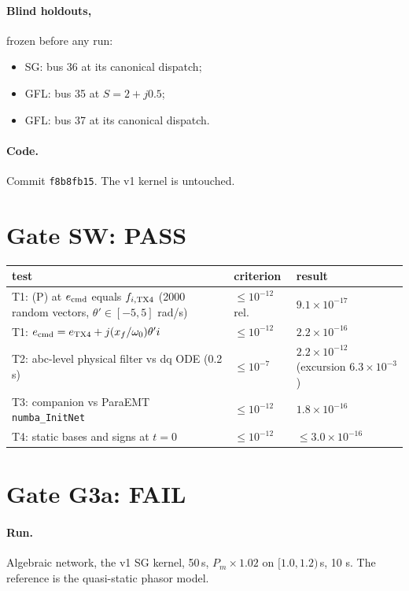 \documentclass[10pt,a4paper]{article}
\newcommand{\us}{\,\textmu s}
\begin{document}
\paragraph{Blind holdouts,} frozen before any run:
\begin{itemize}
\item SG: bus 36 at its canonical dispatch;
\item GFL: bus 35 at $S=2+j0.5$;
\item GFL: bus 37 at its canonical dispatch.
\end{itemize}

\paragraph{Code.} Commit \texttt{f8b8fb15}. The v1 kernel is untouched.

\section{Gate SW: PASS}

\noindent\begin{tabularx}{\linewidth}{@{}YL{2.4cm}L{3.6cm}@{}}
\toprule
test & criterion & result\\
\midrule
T1: (P) at $e_{\rm cmd}$ equals $f_{i,\rm TX4}$ (2000 random vectors, $\theta'\in[-5,5]$ rad/s) & $\le10^{-12}$ rel. & $9.1\times10^{-17}$\\
T1: $e_{\rm cmd}=e_{\rm TX4}+j(x_f/\omega_0)\theta' i$ & $\le10^{-12}$ & $2.2\times10^{-16}$\\
T2: abc-level physical filter vs dq ODE (0.2 s) & $\le10^{-7}$ & $2.2\times10^{-12}$ (excursion $6.3\times10^{-3}$)\\
T3: companion vs ParaEMT \texttt{numba\_InitNet} & $\le10^{-12}$ & $1.8\times10^{-16}$\\
T4: static bases and signs at $t=0$ & $\le10^{-12}$ & $\le3.0\times10^{-16}$\\
\bottomrule
\end{tabularx}

\section{Gate G3a: FAIL}

\paragraph{Run.} Algebraic network, the v1 SG kernel, 50\us, $P_m\times1.02$ on
$[1.0,1.2)$\,s, 10 s. The reference is the quasi-static phasor model.
\end{document}
